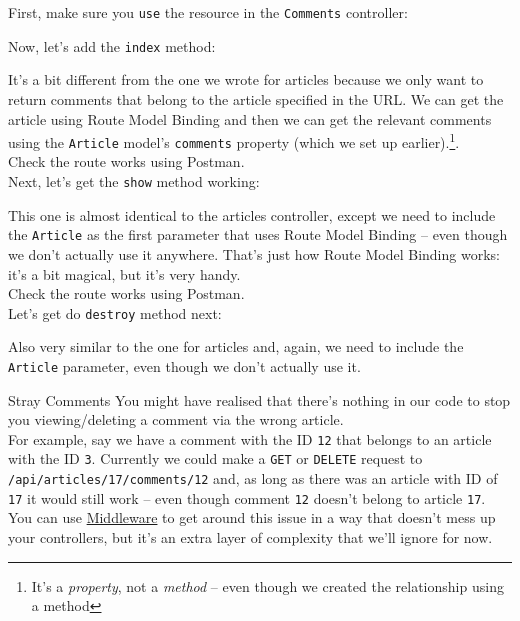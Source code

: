 First, make sure you \texttt{use} the resource in the \texttt{Comments} controller:



Now, let's add the \texttt{index} method:


It's a bit different from the one we wrote for articles because we only want to return comments that belong to the article specified in the URL. We can get the article using Route Model Binding and then we can get the relevant comments using the \texttt{Article} model's \texttt{comments} property (which we set up earlier).\footnote{It's a \textit{property}, not a \textit{method} – even though we created the relationship using a method}.
\\

Check the route works using Postman.
\\

Next, let's get the \texttt{show} method working:


This one is almost identical to the articles controller, except we need to include the \texttt{Article} as the first parameter that uses Route Model Binding – even though we don't actually use it anywhere. That's just how Route Model Binding works: it's a bit magical, but it's very handy.
\\

Check the route works using Postman.
\\

Let's get do \texttt{destroy} method next:


Also very similar to the one for articles and, again, we need to include the \texttt{Article} parameter, even though we don't actually use it.

\begin{infobox}{Stray Comments}
    You might have realised that there's nothing in our code to stop you viewing/deleting a comment via the wrong article.
    \\

    For example, say we have a comment with the ID \texttt{12} that belongs to an article with the ID \texttt{3}. Currently we could make a \texttt{GET} or \texttt{DELETE} request to \\ \texttt{/api/articles/17/comments/12} and, as long as there was an article with ID of \texttt{17} it would still work – even though comment \texttt{12} doesn't belong to article \texttt{17}.
    \\

    You can use \href{http://laravel.com/docs/master/middleware}{Middleware} to get around this issue in a way that doesn't mess up your controllers, but it's an extra layer of complexity that we'll ignore for now.
\end{infobox}

